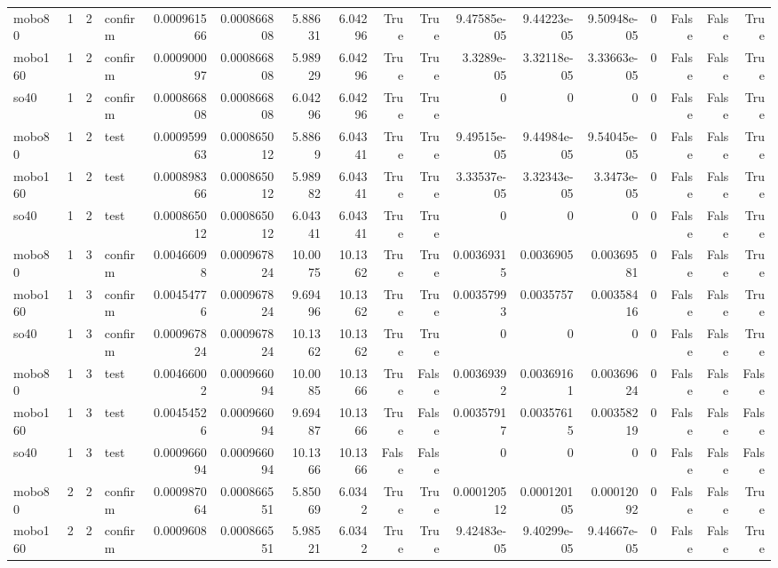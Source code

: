 \begin{tabular}{lrrlrrrrrrrrrrrrr}
mobo80 & 1 & 2 & confirm & 0.000961566 & 0.000866808 & 5.88631 & 6.04296 & True & True & 9.47585e-05 & 9.44223e-05 & 9.50948e-05 & 0 & False & False & True \\
mobo160 & 1 & 2 & confirm & 0.000900097 & 0.000866808 & 5.98929 & 6.04296 & True & True & 3.3289e-05 & 3.32118e-05 & 3.33663e-05 & 0 & False & False & True \\
so40 & 1 & 2 & confirm & 0.000866808 & 0.000866808 & 6.04296 & 6.04296 & True & True & 0 & 0 & 0 & 0 & False & False & True \\
mobo80 & 1 & 2 & test & 0.000959963 & 0.000865012 & 5.8869 & 6.04341 & True & True & 9.49515e-05 & 9.44984e-05 & 9.54045e-05 & 0 & False & False & True \\
mobo160 & 1 & 2 & test & 0.000898366 & 0.000865012 & 5.98982 & 6.04341 & True & True & 3.33537e-05 & 3.32343e-05 & 3.3473e-05 & 0 & False & False & True \\
so40 & 1 & 2 & test & 0.000865012 & 0.000865012 & 6.04341 & 6.04341 & True & True & 0 & 0 & 0 & 0 & False & False & True \\
mobo80 & 1 & 3 & confirm & 0.00466098 & 0.000967824 & 10.0075 & 10.1362 & True & True & 0.00369315 & 0.0036905 & 0.00369581 & 0 & False & False & True \\
mobo160 & 1 & 3 & confirm & 0.00454776 & 0.000967824 & 9.69496 & 10.1362 & True & True & 0.00357993 & 0.0035757 & 0.00358416 & 0 & False & False & True \\
so40 & 1 & 3 & confirm & 0.000967824 & 0.000967824 & 10.1362 & 10.1362 & True & True & 0 & 0 & 0 & 0 & False & False & True \\
mobo80 & 1 & 3 & test & 0.00466002 & 0.000966094 & 10.0085 & 10.1366 & True & False & 0.00369392 & 0.00369161 & 0.00369624 & 0 & False & False & False \\
mobo160 & 1 & 3 & test & 0.00454526 & 0.000966094 & 9.69487 & 10.1366 & True & False & 0.00357917 & 0.00357615 & 0.00358219 & 0 & False & False & False \\
so40 & 1 & 3 & test & 0.000966094 & 0.000966094 & 10.1366 & 10.1366 & False & False & 0 & 0 & 0 & 0 & False & False & False \\
mobo80 & 2 & 2 & confirm & 0.000987064 & 0.000866551 & 5.85069 & 6.0342 & True & True & 0.000120512 & 0.000120105 & 0.00012092 & 0 & False & False & True \\
mobo160 & 2 & 2 & confirm & 0.0009608 & 0.000866551 & 5.98521 & 6.0342 & True & True & 9.42483e-05 & 9.40299e-05 & 9.44667e-05 & 0 & False & False & True \\

\end{tabular}
